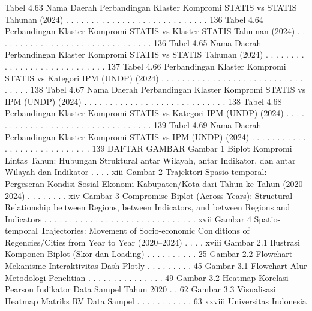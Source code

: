 Tabel 4.63 Nama Daerah Perbandingan Klaster Kompromi STATIS vs STATIS
Tahunan (2024) . . . . . . . . . . . . . . . . . . . . . . . . . . . . 136
Tabel 4.64 Perbandingan Klaster Kompromi STATIS vs Klaster STATIS Tahunan (2024) . . . . . . . . . . . . . . . . . . . . . . . . . . . . . . . 136
Tabel 4.65 Nama Daerah Perbandingan Klaster Kompromi STATIS vs STATIS
Tahunan (2024) . . . . . . . . . . . . . . . . . . . . . . . . . . . . 137
Tabel 4.66 Perbandingan Klaster Kompromi STATIS vs Kategori IPM (UNDP)
(2024) . . . . . . . . . . . . . . . . . . . . . . . . . . . . . . . . . 138
Tabel 4.67 Nama Daerah Perbandingan Klaster Kompromi STATIS vs IPM
(UNDP) (2024) . . . . . . . . . . . . . . . . . . . . . . . . . . . . 138
Tabel 4.68 Perbandingan Klaster Kompromi STATIS vs Kategori IPM (UNDP)
(2024) . . . . . . . . . . . . . . . . . . . . . . . . . . . . . . . . . 139
Tabel 4.69 Nama Daerah Perbandingan Klaster Kompromi STATIS vs IPM
(UNDP) (2024) . . . . . . . . . . . . . . . . . . . . . . . . . . . . 139
DAFTAR GAMBAR
Gambar 1 Biplot Kompromi Lintas Tahun: Hubungan Struktural antar
Wilayah, antar Indikator, dan antar Wilayah dan Indikator . . . . xiii
Gambar 2 Trajektori Spasio-temporal: Pergeseran Kondisi Sosial Ekonomi
Kabupaten/Kota dari Tahun ke Tahun (2020–2024) . . . . . . . . xiv
Gambar 3 Compromise Biplot (Across Years): Structural Relationship between Regions, between Indicators, and between Regions and
Indicators . . . . . . . . . . . . . . . . . . . . . . . . . . . . . . xvii
Gambar 4 Spatio-temporal Trajectories: Movement of Socio-economic Conditions of Regencies/Cities from Year to Year (2020–2024) . . . . xviii
Gambar 2.1 Ilustrasi Komponen Biplot (Skor dan Loading) . . . . . . . . . . 25
Gambar 2.2 Flowchart Mekanisme Interaktivitas Dash-Plotly . . . . . . . . . 45
Gambar 3.1 Flowchart Alur Metodologi Penelitian . . . . . . . . . . . . . . . 49
Gambar 3.2 Heatmap Korelasi Pearson Indikator Data Sampel Tahun 2020 . . 62
Gambar 3.3 Visualisasi Heatmap Matriks RV Data Sampel . . . . . . . . . . . 63
xxviii Universitas Indonesia

